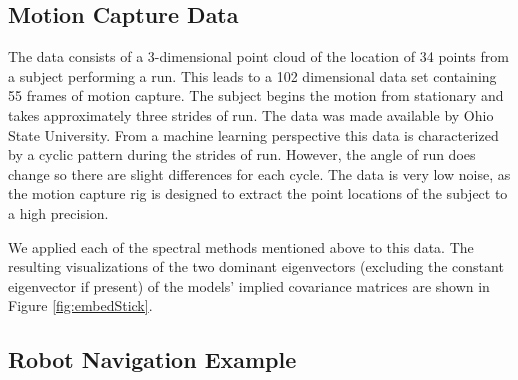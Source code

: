 \subsection{Motion Capture Data}

The data consists of a 3-dimensional point cloud of the location of 34
points from a subject performing a run. This leads to a 102
dimensional data set containing 55 frames of motion capture. The
subject begins the motion from stationary and takes approximately
three strides of run. The data was made available by Ohio State
University. From a machine learning perspective this data is
characterized by a cyclic pattern during the strides of run. However,
the angle of run does change so there are slight differences for each
cycle. The data is very low noise, as the motion capture rig is
designed to extract the point locations of the subject to a high
precision.

We applied each of the spectral methods mentioned above to this
data. The resulting visualizations of the two dominant eigenvectors
(excluding the constant eigenvector if present) of the models' implied
covariance matrices are shown in Figure \ref{fig:embedStick}.
\begin{figure*}
  \hfill
  \hfill
  \hfill
  \hfill
  \hfill

  \caption{(a) Laplacian eigenmaps, (b) Locally linear embedding, (c) isomap, (d) maximum variance unfolding, (e) the maximum entropy unfolding, (f) the DRILL embedding of the motion capture data. Models capture either the cyclic structure or the structure associated with the start of the run.}\label{fig:embedStick}
\end{figure*}


\subsection{Robot Navigation Example}

